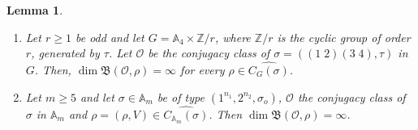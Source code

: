\documentclass[11pt]{amsart} \textheight 22cm
\newcommand\sigmao{\sigma_{o}}
\renewcommand{\^}[1]{\mbox{$^{\left( #1 \right)}$}}
\renewcommand{\_}[1]{\mbox{$_{\left( #1 \right)}$}}
\newcommand\toba{{\mathfrak B }}
\newcommand{\Z}{{\mathbb Z}}
\newcommand{\Oc}{{\mathcal O}}
\theoremstyle{plain}
\newtheorem{lema}{Lemma}[section]
\theoremstyle{definition}
\theoremstyle{remark}
\theoremstyle{remark}
\begin{document}
\begin{lema}\label{lema:a4xcr}
    \begin{enumerate}
        \item
            Let $r\ge 1$ be odd and let $G=\mathbb{A}_4\times
            \Z/r$, where $\Z/r$ is the cyclic group of order
            $r$, generated by $\tau$.  Let $\Oc$ be the
            conjugacy class of $\sigma= ((1\;2)(3\;4),\tau)$
            in $G$. Then, $\dim\toba{(\Oc,\rho)}=\infty$ for
            every $\rho\in\widehat{C_{G}(\sigma)}$.


        \item\label{prop:2^n2}
            Let $m\ge 5$ and let $\sigma\in\mathbb{A}_{m}$ be
            of type $(1^{n_{1}},2^{n_{2}},\sigmao)$,
            $\mathcal{O}$ the conjugacy class of $\sigma$ in
            $\mathbb{A}_{m}$ and
            $\rho=(\rho,V)\in\widehat{C_{\mathbb{A}_{m}}(\sigma)}$.
            Then $\dim\mathfrak{B}(\mathcal{O},\rho)=\infty$.
    \end{enumerate}
\end{lema}
\end{document}
